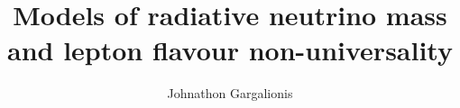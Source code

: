 \title{Models of radiative neutrino mass and lepton flavour non-universality}

\author{Johnathon Gargalionis}



